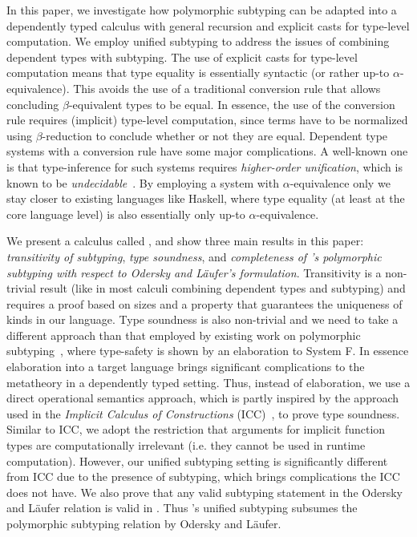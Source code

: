 In this paper, we investigate how polymorphic subtyping can be
adapted into a dependently typed calculus with general recursion and
explicit casts for type-level computation. We employ unified subtyping
to address the issues of combining dependent types with subtyping.
The use of explicit casts
for type-level computation means that type equality is essentially
syntactic (or rather up-to $\alpha$-equivalence).
This avoids the use of a traditional conversion rule that allows concluding
$\beta$-equivalent types to be equal. In essence, the use of the conversion
rule requires (implicit) type-level computation, since terms have to be normalized
using $\beta$-reduction to conclude whether or not they are equal.
Dependent type systems with a conversion rule have some major complications.
A well-known one is that type-inference for such systems requires \emph{higher-order
  unification}, which is known to be \emph{undecidable}~\citep{goldfarb1981undecidability}.
By employing a system with $\alpha$-equivalence only we stay closer to existing
languages like Haskell, where type equality (at least at the core language level)
is also essentially only up-to $\alpha$-equivalence.

We present a calculus called \name, and show three main results in this paper:
\emph{transitivity of subtyping}, \emph{type soundness}, and \emph{completeness
of \name's polymorphic subtyping with respect to Odersky and L\"aufer's formulation}.
Transitivity is a non-trivial result (like in most calculi combining dependent types
and subtyping) and requires a proof based on sizes and a property that guarantees
the uniqueness of kinds in our language. Type soundness is also non-trivial and we need
to take a different approach than that employed by existing work on polymorphic
subtyping~\citep{odersky1996putting, jones2007practical}, where type-safety is shown by an
elaboration to System F. In essence elaboration into a target language
brings significant complications to the metatheory in a dependently typed setting.
Thus, instead of elaboration, we use a direct operational semantics approach, which
is partly inspired by the approach used in the \emph{Implicit Calculus of Constructions} (ICC)~\citep{miquel2001implicit,barras2008implicit},
to prove type soundness.
Similar to ICC, we adopt the restriction that arguments for implicit function types
are computationally irrelevant (i.e. they cannot be used in runtime computation).
However, our unified subtyping setting is significantly
different from ICC due to the presence of subtyping,
which brings complications the ICC does not have.
We also prove that any valid subtyping statement in the Odersky and L\"aufer relation
is valid in \name. Thus \name's unified subtyping subsumes the polymorphic subtyping
relation by Odersky and L\"aufer.

